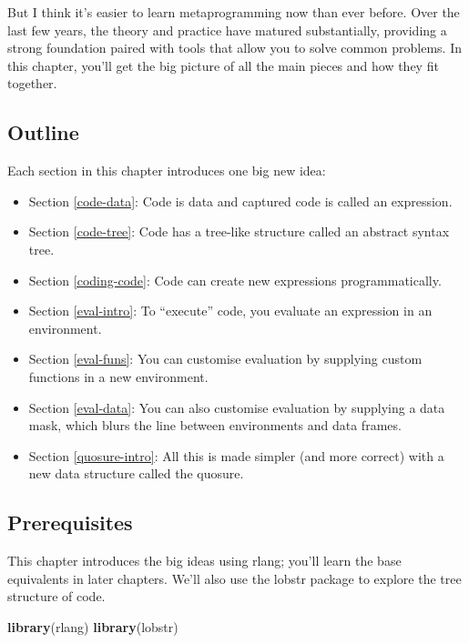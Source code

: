 \documentclass[]{book}
\newenvironment{Shaded}{\begin{snugshade}}{\end{snugshade}}
\newcommand{\KeywordTok}[1]{\textcolor[rgb]{0.27,0.27,0.27}{\textbf{#1}}}
\newcommand{\NormalTok}[1]{#1}
\begin{document}
But I think it's easier to learn metaprogramming now than ever before. Over the last few years, the theory and practice have matured substantially, providing a strong foundation paired with tools that allow you to solve common problems. In this chapter, you'll get the big picture of all the main pieces and how they fit together.

\hypertarget{outline}{%
\subsection*{Outline}\label{outline}}

Each section in this chapter introduces one big new idea:

\begin{itemize}
\item
  Section \ref{code-data}: Code is data and captured code is called an
  expression.
\item
  Section \ref{code-tree}: Code has a tree-like structure called an
  abstract syntax tree.
\item
  Section \ref{coding-code}: Code can create new expressions programmatically.
\item
  Section \ref{eval-intro}: To ``execute'' code, you evaluate an expression in
  an environment.
\item
  Section \ref{eval-funs}: You can customise evaluation by supplying custom
  functions in a new environment.
\item
  Section \ref{eval-data}: You can also customise evaluation by supplying a
  data mask, which blurs the line between environments and data frames.
\item
  Section \ref{quosure-intro}: All this is made simpler (and more correct)
  with a new data structure called the quosure.
\end{itemize}

\hypertarget{prerequisites}{%
\subsection*{Prerequisites}\label{prerequisites}}

This chapter introduces the big ideas using rlang; you'll learn the base equivalents in later chapters. We'll also use the lobstr package to explore the tree structure of code.

\begin{Shaded}
\begin{Highlighting}[]
\KeywordTok{library}\NormalTok{(rlang)}
\KeywordTok{library}\NormalTok{(lobstr)}
\end{Highlighting}
\end{Shaded}
\end{document}
